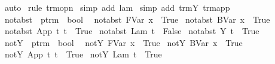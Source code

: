 \begin{isabellebody}
\ auto{\isacharbrackleft}{}{\isacharbrackright}\isanewline
{}\isamarkupfalse%
\ {\isacharparenleft}rule\ trm{\isacharunderscore}opn{\isacharparenright}\isanewline
{}\isamarkupfalse%
\ {\isacharparenleft}simp\ add{\isacharcolon}\ lam{\isacharparenright}\isanewline
{}\isamarkupfalse%
\ {\isacharparenleft}simp\ add{\isacharcolon}\ trm{\isachardot}Y\ trm{\isachardot}app{\isacharparenright}\isanewline
{}\isamarkupfalse%
%
\endisatagproof
{\isafoldproof}%
%
\isadelimproof
%
\endisadelimproof
%
\isamarkuptrue%
\isamarkupfalse%
\ not{\isacharunderscore}abst\ {\isacharcolon}{\isacharcolon}\ {\isachardoublequoteopen}ptrm\ {\isasymRightarrow}\ bool{\isachardoublequoteclose}\isanewline
{}\isanewline
\ \ {\isachardoublequoteopen}not{\isacharunderscore}abst\ {\isacharparenleft}FVar\ x{\isacharparenright}\ {\isacharequal}\ True{\isachardoublequoteclose}\isanewline
{\isacharbar}\ {\isachardoublequoteopen}not{\isacharunderscore}abst\ {\isacharparenleft}BVar\ x{\isacharparenright}\ {\isacharequal}\ True{\isachardoublequoteclose}\isanewline
{\isacharbar}\ {\isachardoublequoteopen}not{\isacharunderscore}abst\ {\isacharparenleft}App\ t{}\ t{}{\isacharparenright}\ {\isacharequal}\ True{\isachardoublequoteclose}\isanewline
{\isacharbar}\ {\isachardoublequoteopen}not{\isacharunderscore}abst\ {\isacharparenleft}Lam\ t{\isacharparenright}\ {\isacharequal}\ False{\isachardoublequoteclose}\isanewline
{\isacharbar}\ {\isachardoublequoteopen}not{\isacharunderscore}abst\ {\isacharparenleft}Y\ t{\isacharparenright}\ {\isacharequal}\ True{\isachardoublequoteclose}\isanewline
\isanewline
{}\isamarkupfalse%
\ not{\isacharunderscore}Y\ {\isacharcolon}{\isacharcolon}\ {\isachardoublequoteopen}ptrm\ {\isasymRightarrow}\ bool{\isachardoublequoteclose}\isanewline
{}\isanewline
\ \ {\isachardoublequoteopen}not{\isacharunderscore}Y\ {\isacharparenleft}FVar\ x{\isacharparenright}\ {\isacharequal}\ True{\isachardoublequoteclose}\isanewline
{\isacharbar}\ {\isachardoublequoteopen}not{\isacharunderscore}Y\ {\isacharparenleft}BVar\ x{\isacharparenright}\ {\isacharequal}\ True{\isachardoublequoteclose}\isanewline
{\isacharbar}\ {\isachardoublequoteopen}not{\isacharunderscore}Y\ {\isacharparenleft}App\ t{}\ t{}{\isacharparenright}\ {\isacharequal}\ True{\isachardoublequoteclose}\isanewline
{\isacharbar}\ {\isachardoublequoteopen}not{\isacharunderscore}Y\ {\isacharparenleft}Lam\ t{\isacharparenright}\ {\isacharequal}\ True{\isachardoublequoteclose}\isanewline

\end{isabellebody}

